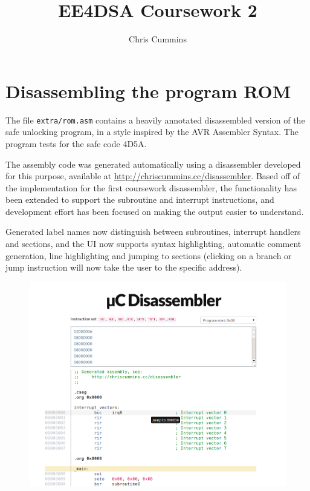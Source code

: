 \documentclass[12pt,a4paper]{article}
\title{EE4DSA Coursework 2}
\author{Chris Cummins}
\begin{document}
\maketitle

\section{Disassembling the program ROM}

The file \texttt{extra/rom.asm} contains a heavily annotated
disassembled version of the safe unlocking program, in a style
inspired by the AVR Assembler Syntax. The program tests for the safe
code 4D5A.

The assembly code was generated automatically using a disassembler
developed for this purpose, available at
\url{http://chriscummins.cc/disassembler}. Based off of the
implementation for the first coursework disassembler, the
functionality has been extended to support the subroutine and
interrupt instructions, and development effort has been focused on
making the output easier to understand.

Generated label names now distinguish between subroutines, interrupt
handlers and sections, and the UI now supports syntax highlighting,
automatic comment generation, line highlighting and jumping to
sections (clicking on a branch or jump instruction will now take the
user to the specific address).

\begin{figure}[H]
  \centering
  \includegraphics[width=6in]{assets/disassembler.png}
\end{figure}
\end{document}
